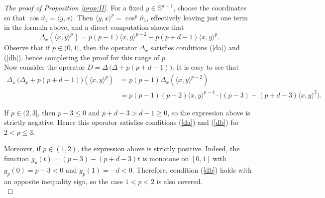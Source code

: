 \documentclass[11pt, leqno]{amsart}
\def\theta{\vartheta}
\theoremstyle{definition}
\numberwithin{equation}{section}
\begin{document}
\begin{proof}[The proof of Proposition \ref{prop:II}]
For a fixed $y\in \mathbb S^{d-1}$, choose the coordinates so that $\cos \theta_1 = \langle y, x\rangle$. Then $ \langle y, x\rangle^p = \cos^p \theta_1$, effectively leaving just one term in the formula above, and a direct computation shows that 
 \begin{equation}\label{e.4.19}
\Delta_x   \left(  \langle x, y \rangle^p \right)  = p (p-1) \langle x, y \rangle^{p-2} - p (p+d-1) \langle x, y \rangle^p.
\end{equation}
Observe that if $p\in (0,1]$, then the operator $\Delta_x$ satisfies conditions (\ref{da}) and (\ref{db}), hence completing the proof for this range of $p$.\\

Now consider the operator 
$D = \Delta \, \big( \Delta +  p (p+d -1) \big)$.
It is easy to see that 
\begin{equation}\label{e.4.20}
\begin{aligned}
    \Delta_x \, \big( \Delta_x +  p (p+d -1) \big)   \left(  \langle x, y \rangle^p \right)  & = p (p-1)  \Delta_x   \left(  \langle x, y \rangle^{p-2} \right)  \\ 
 & = p(p-1) (p-2) \langle x, y \rangle^{p-4} \cdot \big(  (p-3)  -  (p+d-3) \langle x, y \rangle^2\big). 
\end{aligned}
\end{equation} 

If $p\in (2, 3]$, then $p-3 \le 0$ and $p+d -3 > d-1 \ge 0$, so the expression above is strictly negative. Hence this operator satisfies conditions (\ref{da}) and (\ref{db}) for $2<p\le 3$. 

Moreover, if $p \in (1,2)$, the expression above is strictly positive. Indeed, the function $g_p(t) = (p-3) - (p+d-3) t $ is monotone on $[0,1]$ with $g_p (0) = p-3 < 0$ and $g_p (1) = - d < 0$. Therefore, condition (\ref{db}) holds with an opposite inequality sign, so the case $1<p<2$ is also covered.\\




\end{proof}
\end{document}
